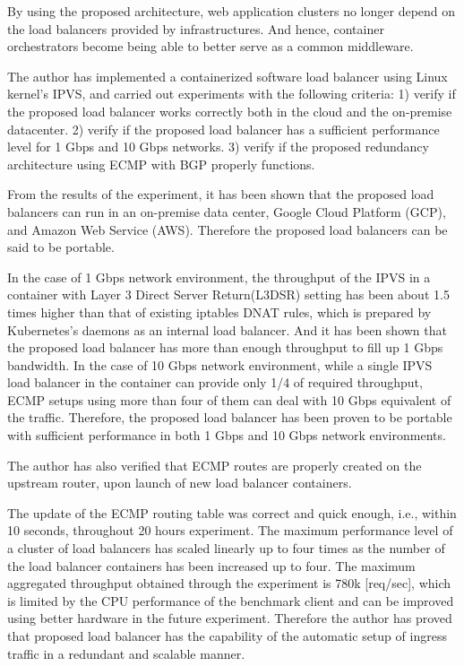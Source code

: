 By using the proposed architecture, web application clusters no longer depend on the load balancers provided by infrastructures.
And hence, container orchestrators become being able to better serve as a common middleware.

The author has implemented a containerized software load balancer using Linux kernel's IPVS, and carried out experiments with the following criteria:
  1) verify if the proposed load balancer works correctly both in the cloud and the on-premise datacenter.
  2) verify if the proposed load balancer has a sufficient performance level for 1 Gbps and 10 Gbps networks.
  3) verify if the proposed redundancy architecture using ECMP with BGP properly functions.




From the results of the experiment, it has been shown that the proposed load balancers can run in an on-premise data center, Google Cloud Platform (GCP), and Amazon Web Service (AWS).
Therefore the proposed load balancers can be said to be portable.
%



  In the case of 1 Gbps network environment, the throughput of the IPVS in a container with Layer 3 Direct Server Return(L3DSR) setting has been about 1.5 times higher than that of existing iptables DNAT rules, which is prepared by Kubernetes's daemons as an internal load balancer. 
  And it has been shown that the proposed load balancer has more than enough throughput to fill up 1 Gbps bandwidth.
  In the case of 10 Gbps network environment, while a single IPVS load balancer in the container can provide only 1/4 of required throughput, ECMP setups using more than four of them can deal with 10 Gbps equivalent of the traffic.
  Therefore, the proposed load balancer has been proven to be portable with sufficient performance in both 1 Gbps and 10 Gbps network environments.







%
The author has also verified that ECMP routes are properly created on the upstream router, upon launch of new load balancer containers.

The update of the ECMP routing table was correct and quick enough, i.e., within 10 seconds, throughout 20 hours experiment.
The maximum performance level of a cluster of load balancers has scaled linearly up to four times as the number of the load balancer containers has been increased up to four.
The maximum aggregated throughput obtained through the experiment is 780k [req/sec], which is limited by the CPU performance of the benchmark client and can be improved using better hardware in the future experiment.
Therefore the author has proved that proposed load balancer has the capability of the automatic setup of ingress traffic in a redundant and scalable manner.



